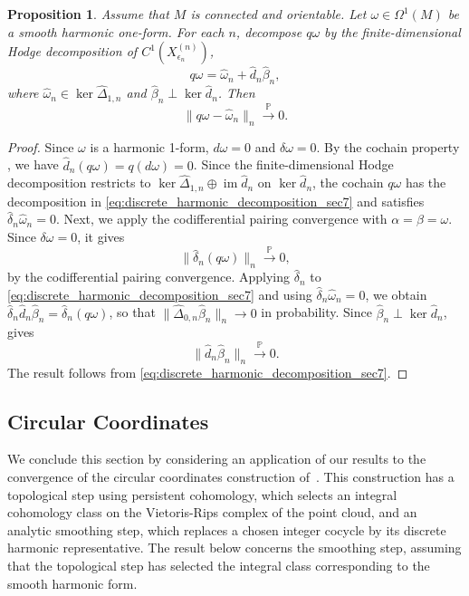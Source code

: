 \documentclass[11pt,reqno]{amsproc}
\numberwithin{equation}{section}
\newcommand{\PP}{\mathbb{P}}
\newcommand{\hd}{\hat{d}}
\newcommand{\hdelta}{\hat{\delta}}
\newcommand{\homega}{\hat{\omega}}
\newcommand{\im}{\operatorname{im}}
\newtheorem{proposition}[counter]{Proposition}
\theoremstyle{definition}
\theoremstyle{plain}
\begin{document}
    \begin{proposition} \label{prop:harmonic_one_form_projection_sec7}
    Assume that $M$ is connected and orientable.  Let $\omega\in \Omega^1(M)$ be a smooth harmonic one-form.  For each $n$, decompose $q\omega$ by the finite-dimensional Hodge decomposition of $C^1(X^{(n)}_{\epsilon_n})$,
    \begin{equation} \label{eq:discrete_harmonic_decomposition_sec7}
        q\omega
        =
        \homega_n+
        \hd_n\widehat\beta_n,
    \end{equation}
    where $\homega_n\in \ker \widehat\Delta_{1,n}$ and $\widehat\beta_n\perp \ker\hd_n$.  Then
    \[
        \|q\omega-\homega_n\|_n\xrightarrow{\PP}0.
    \]
    \end{proposition}

    \begin{proof}
    Since $\omega$ is a harmonic 1-form, $d\omega=0$ and $\delta\omega=0$.  By the cochain property , we have $\hd_n(q\omega)=q(d\omega)=0$.
    Since the finite-dimensional Hodge decomposition restricts to $\ker\widehat\Delta_{1,n}\oplus\im\hd_n$ on $\ker\hd_n$, the cochain $q\omega$ has the decomposition in \eqref{eq:discrete_harmonic_decomposition_sec7} and satisfies $\hdelta_n \homega_n = 0$.
    Next, we apply the codifferential pairing convergence  with $\alpha=\beta=\omega$.  Since $\delta\omega=0$, it gives
    \[
        \|\hdelta_n(q\omega)\|_n\xrightarrow{\PP}0,
    \]
    by the codifferential pairing convergence.  Applying $\hdelta_n$ to \eqref{eq:discrete_harmonic_decomposition_sec7} and using $\hdelta_n\homega_n=0$, we obtain $\hdelta_n\hd_n\widehat\beta_n= \hdelta_n(q\omega)$, so that $\|\widehat\Delta_{0,n}\widehat\beta_n\|_n\to 0$ in probability.  Since $\widehat\beta_n\perp\ker\hd_n$,  gives
    \[
        \|\hd_n\widehat\beta_n\|_n\xrightarrow{\PP}0.
    \]
    The result follows from \eqref{eq:discrete_harmonic_decomposition_sec7}.
    \end{proof}

    \subsection{Circular Coordinates}

    We conclude this section by considering an application of our results to the convergence of the circular coordinates construction of~\cite{deSilva2011}. This construction has a topological step using persistent cohomology, which selects an integral cohomology class on the Vietoris-Rips complex of the point cloud, and an analytic smoothing step, which replaces a chosen integer cocycle by its discrete harmonic representative. The result below concerns the smoothing step, assuming that the topological step has selected the integral class corresponding to the smooth harmonic form.
\end{document}
